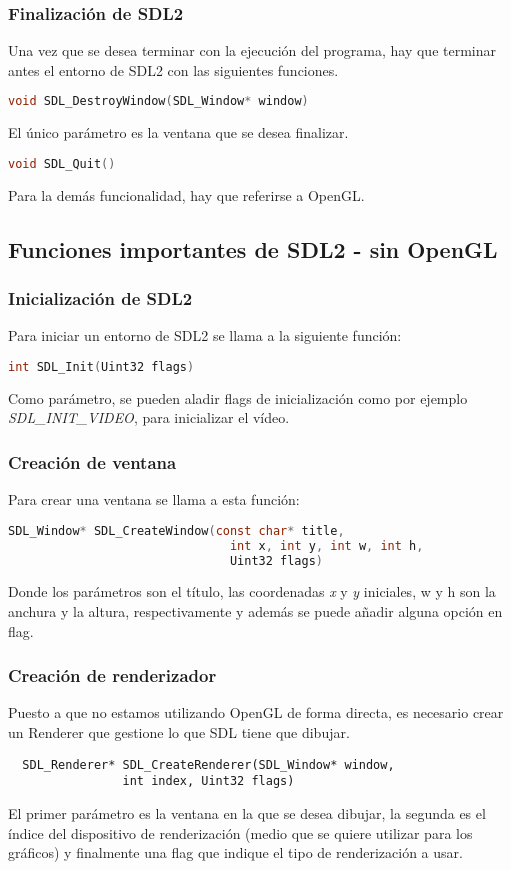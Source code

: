\subsubsection{Finalización de SDL2}
Una vez que se desea terminar con la ejecución del programa, hay que terminar antes el entorno de SDL2 con las siguientes funciones.
\begin{lstlisting}[language=C]
  void SDL_DestroyWindow(SDL_Window* window)
\end{lstlisting}
El único parámetro es la ventana que se desea finalizar.
\begin{lstlisting}[language=C]
  void SDL_Quit()
\end{lstlisting}

Para la demás funcionalidad, hay que referirse a OpenGL.

\subsection{Funciones importantes de SDL2 - sin OpenGL}
\subsubsection{Inicialización de SDL2}
Para iniciar un entorno de SDL2 se llama a la siguiente función:
\begin{lstlisting}[language=C]
  int SDL_Init(Uint32 flags)
\end{lstlisting}
Como parámetro, se pueden aladir flags de inicialización como por ejemplo \textit{SDL\_INIT\_VIDEO}, para inicializar el vídeo.

\subsubsection{Creación de ventana}
Para crear una ventana se llama a esta función:
\begin{lstlisting}[language=C]
  SDL_Window* SDL_CreateWindow(const char* title,
                               int x, int y, int w, int h,
                               Uint32 flags)
\end{lstlisting}
Donde los parámetros son el título, las coordenadas \textit{x} y \textit{y} iniciales, w y h son la anchura y la altura, respectivamente y además se puede añadir alguna opción en flag.

\subsubsection{Creación de renderizador}
Puesto a que no estamos utilizando OpenGL de forma directa, es necesario crear un Renderer que gestione lo que SDL tiene que dibujar.
\begin{lstlisting}
  SDL_Renderer* SDL_CreateRenderer(SDL_Window* window,
                int index, Uint32 flags)
\end{lstlisting}
El primer parámetro es la ventana en la que se desea dibujar, la segunda es el índice del dispositivo de renderización (medio que se quiere utilizar para los gráficos) y finalmente una flag que indique el tipo de renderización a usar.


